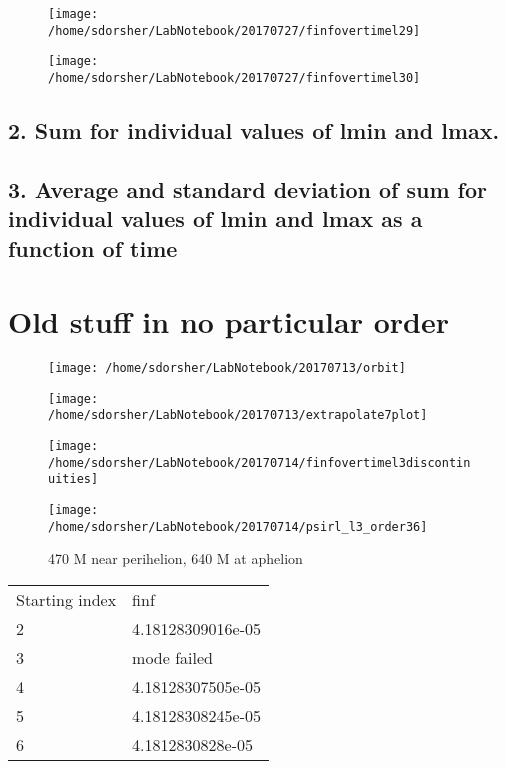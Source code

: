 \documentclass{article}
\begin{document}
\begin{figure}
  \texttt{[image: /home/sdorsher/LabNotebook/20170727/finfovertimel29]}
\end{figure}

\begin{figure}
  \texttt{[image: /home/sdorsher/LabNotebook/20170727/finfovertimel30]}
\end{figure}

\subsection{2. Sum for individual values of lmin and lmax.}

\subsection{3. Average and standard deviation of sum for individual values of lmin and lmax as a function of time}


\section{Old stuff in no particular order}






\begin{figure}
\texttt{[image: /home/sdorsher/LabNotebook/20170713/orbit]}
\end{figure}


\begin{figure}
\texttt{[image: /home/sdorsher/LabNotebook/20170713/extrapolate7plot]}
\end{figure}

\begin{figure}
  \texttt{[image: /home/sdorsher/LabNotebook/20170714/finfovertimel3discontinuities]}
\end{figure}


\begin{figure}
  \texttt{[image: /home/sdorsher/LabNotebook/20170714/psirl\_l3\_order36]}
  \caption{470 M near perihelion, 640 M at aphelion}
\end{figure}



\begin{table}
\begin{tabular}{ll}
Starting index & finf\\
2 & 4.18128309016e-05\\
3 & mode failed\\
4 & 4.18128307505e-05\\
5 & 4.18128308245e-05\\
6 & 4.1812830828e-05\\
\end{tabular}
\end{table}
\end{document}
